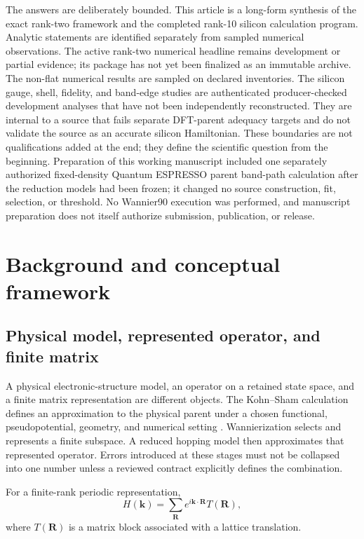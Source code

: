 \documentclass[11pt]{article}
\theoremstyle{definition}
\newcommand{\kvec}{\mathbf k}
\newcommand{\Rvec}{\mathbf R}
\begin{document}
The answers are deliberately bounded.  This article is a long-form synthesis of the
exact rank-two framework and the completed rank-10 silicon calculation program.
Analytic statements are identified separately from sampled numerical observations.  The
active rank-two numerical headline remains development or partial evidence; its package
has not yet been finalized as an immutable archive.  The non-flat numerical results are
sampled on declared inventories.  The silicon gauge, shell, fidelity, and band-edge studies are
authenticated producer-checked development analyses that have not been independently
reconstructed.  They are internal to a source that fails separate DFT-parent adequacy
targets and do not validate the source as an accurate silicon Hamiltonian.  These
boundaries are not qualifications added at the end; they define the scientific question
from the beginning.  Preparation of this working manuscript included one separately
authorized fixed-density Quantum ESPRESSO parent band-path calculation after the
reduction models had been frozen; it changed no source construction, fit, selection, or
threshold.  No Wannier90 execution was performed, and manuscript preparation does not
itself authorize submission, publication, or release.

\section{Background and conceptual framework}

\subsection{Physical model, represented operator, and finite matrix}

A physical electronic-structure model, an operator on a retained state space, and a
finite matrix representation are different objects.  The Kohn--Sham calculation defines
an approximation to the physical parent under a chosen functional, pseudopotential,
geometry, and numerical setting \cite{hohenberg1964,kohn1965,perdew1996,hamann2013}.
Wannierization selects and represents a finite subspace.  A reduced hopping model then
approximates that represented operator.  Errors introduced at these stages must not be
collapsed into one number unless a reviewed contract explicitly defines the combination.

For a finite-rank periodic representation,
\begin{equation}
 H(\kvec)=\sum_{\Rvec} e^{i\kvec\cdot\Rvec}T(\Rvec),
 \label{eq:fourier-main}
\end{equation}
where $T(\Rvec)$ is a matrix block associated with a lattice translation.
\end{document}
